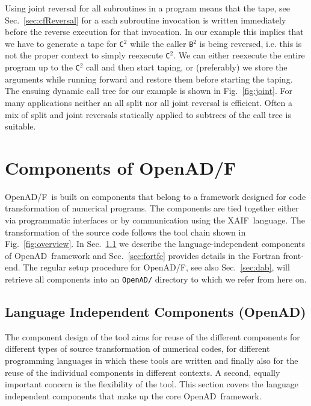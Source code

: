 \documentclass{book}
\newcommand{\OpenADF}{OpenAD/F}
\newcommand{\OpenAD}{OpenAD}
\newcommand{\xaif}{XAIF}
\newcommand{\refsec}[1]{{Sec.~\ref{#1}}}
\newcommand{\reffig}[1]{{Fig.~\ref{#1}}}
\begin{document}
Using joint reversal for all subroutines in a program 
means that the tape, see \refsec{sec:cfReversal} for a each 
subroutine invocation is written immediately before the reverse execution for 
that invocation. In our example this implies that we have to generate 
a tape for \lstinline{C}$^2$ while the caller \lstinline{B}$^2$ is being reversed, 
i.e. this is not the proper context to simply reexecute \lstinline{C}$^2$. 
We can either reexecute the entire program up to the  \lstinline{C}$^2$
call and then start taping, or (preferably) we store the arguments while 
running forward and restore them before starting the taping. 
The ensuing dynamic call tree for our example is 
shown in \reffig{fig:joint}. 
For many applications neither an all split nor all joint reversal
is efficient. Often a mix of split and joint reversals statically  
applied to subtrees of the call tree is suitable.  

\chapter{Components of \OpenADF}\label{sec:openadfcomponents}

\OpenADF\ is built on components that belong to a framework designed
for code transformation of numerical programs.  The components are
tied together either via programmatic interfaces or by communication
using the \xaif\ language. The transformation of the source code follows the
tool chain shown in \reffig{fig:overview}.  
In \refsec{sec:openadcomponents} we describe the language-independent 
components of \OpenAD\ framework and \refsec{sec:fortfe} provides details 
in the Fortran front-end.
The regular setup procedure for \OpenADF, see also \refsec{sec:dab}, 
will retrieve all components into an \lstinline{OpenAD/} directory to which 
we refer from here on.  

\section{Language Independent Components (\OpenAD)}\label{sec:openadcomponents}

The component design of the tool aims for reuse of the different components 
for different types of source transformation of numerical codes, for 
different programming languages in which these tools are written and finally 
also for the reuse of the individual components in different contexts. 
A second, equally important concern is the flexibility of the tool.  
This section covers the language independent components that make up the core \OpenAD\ framework. 
\end{document}
